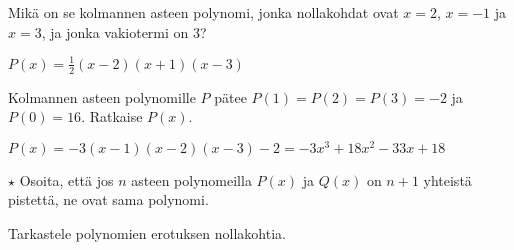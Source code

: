 \begin{tehtavasivu}
\begin{tehtava}
    Mikä on se kolmannen asteen polynomi, jonka nollakohdat ovat $x=2$, $x=-1$ ja $x=3$, ja jonka vakiotermi on $3$?
    \begin{vastaus}
        $P(x)=\frac{1}{2}(x-2)(x+1)(x-3)$
    \end{vastaus}
\end{tehtava}

\begin{tehtava}
    Kolmannen asteen polynomille $P$ pätee $P(1)=P(2)=P(3)=-2$ ja $P(0)=16$. Ratkaise $P(x)$.
    \begin{vastaus}
        $P(x)=-3(x-1)(x-2)(x-3)-2=-3x^3+18x^2-33x+18$
    \end{vastaus}
\end{tehtava}

\begin{tehtava}
   	$\star$ Osoita, että jos $n$ asteen polynomeilla $P(x)$ ja $Q(x)$ on $n+1$ yhteistä pistettä, ne ovat sama polynomi.
    \begin{vastaus}
        Tarkastele polynomien erotuksen nollakohtia.
    \end{vastaus}
\end{tehtava}

\end{tehtavasivu}